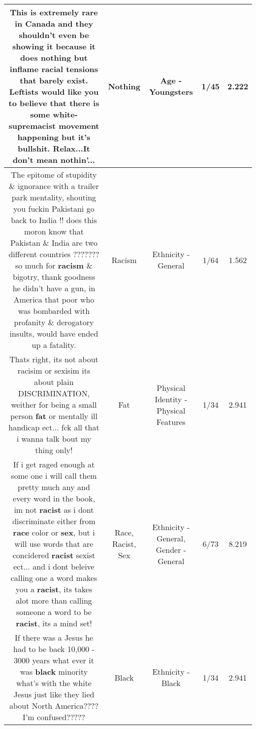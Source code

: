 \documentclass[11pt]{article}
\newlength\mylength
\begin{document}
\begin{center}
\begin{longtable}{|C{.65\mylength}|C{.30\mylength}|C{.12\mylength}|C{.12\mylength}|C{.12\mylength}|}
  \small This is extremely rare in Canada and they shouldn't even be showing it because it does \textbf{nothing} but inflame racial tensions that barely exist. Leftists would like you to believe that there is some white-supremacist movement happening but it's bullshit. Relax...It don't mean nothin'...\normalsize   & Nothing & Age - Youngsters & 1/45 & 2.222 \\  \hline
  \small The epitome of stupidity \& ignorance with a trailer park mentality, shouting you fuckin Pakistani go back to India  !!  does this moron know that Pakistan \& India are two different countries ??????? so much for \textbf{racism} \& bigotry, thank goodness he didn't have a gun, in America that poor who was bombarded with profanity \& derogatory insults, would have ended up a fatality.\normalsize   & Racism & Ethnicity - General & 1/64 & 1.562 \\  \hline
  \small Thats right, its not about racisim or sexisim its about plain DISCRIMINATION, weither for being a small person \textbf{fat} or mentally ill handicap ect... fck all that i wanna talk bout my thing only!\normalsize   & Fat & Physical Identity - Physical Features & 1/34 & 2.941 \\  \hline
  \small If i get raged enough at some one i will call them pretty much any and every word in the book, im not \textbf{racist} as i dont discriminate either from \textbf{race} color or \textbf{sex}, but i will use words that are concidered \textbf{racist} sexist ect... and i dont beleive calling one a word makes you a \textbf{racist}, its takes alot more than calling someone a word to be \textbf{racist}, its a mind set!\normalsize   & Race, Racist, Sex & Ethnicity - General, Gender - General & 6/73 & 8.219 \\  \hline
  \small If there was a Jesus he had to be back 10,000 - 3000 years what ever it was \textbf{black} minority what's with the white Jesus just like they lied about North America???? I'm confused?????\normalsize   & Black & Ethnicity - Black & 1/34 & 2.941 \\  \hline

\end{longtable}
\end{center}
\end{document}
